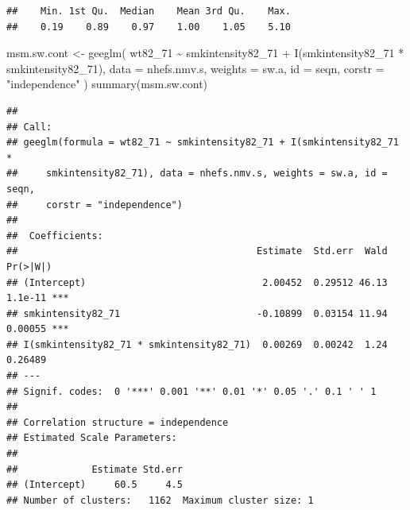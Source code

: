 \documentclass[
  10pt,
]{book}
\newenvironment{Shaded}{\begin{snugshade}}{\end{snugshade}}
\newcommand{\AttributeTok}[1]{\textcolor[rgb]{0.77,0.63,0.00}{#1}}
\newcommand{\CommentTok}[1]{\textcolor[rgb]{0.56,0.35,0.01}{\textit{#1}}}
\newcommand{\DecValTok}[1]{\textcolor[rgb]{0.00,0.00,0.81}{#1}}
\newcommand{\FunctionTok}[1]{\textcolor[rgb]{0.00,0.00,0.00}{#1}}
\newcommand{\NormalTok}[1]{#1}
\newcommand{\OtherTok}[1]{\textcolor[rgb]{0.56,0.35,0.01}{#1}}
\newcommand{\SpecialCharTok}[1]{\textcolor[rgb]{0.00,0.00,0.00}{#1}}
\newcommand{\StringTok}[1]{\textcolor[rgb]{0.31,0.60,0.02}{#1}}
\begin{document}
\begin{Shaded}
\end{Shaded}

\begin{verbatim}
##    Min. 1st Qu.  Median    Mean 3rd Qu.    Max. 
##    0.19    0.89    0.97    1.00    1.05    5.10
\end{verbatim}

\begin{Shaded}
\begin{Highlighting}[]
\NormalTok{msm.sw.cont }\OtherTok{\textless{}{-}}
  \FunctionTok{geeglm}\NormalTok{(}
\NormalTok{    wt82\_71 }\SpecialCharTok{\textasciitilde{}}\NormalTok{ smkintensity82\_71 }\SpecialCharTok{+} \FunctionTok{I}\NormalTok{(smkintensity82\_71 }\SpecialCharTok{*}\NormalTok{ smkintensity82\_71),}
    \AttributeTok{data =}\NormalTok{ nhefs.nmv.s,}
    \AttributeTok{weights =}\NormalTok{ sw.a,}
    \AttributeTok{id =}\NormalTok{ seqn,}
    \AttributeTok{corstr =} \StringTok{"independence"}
\NormalTok{  )}
\FunctionTok{summary}\NormalTok{(msm.sw.cont)}
\end{Highlighting}
\end{Shaded}

\begin{verbatim}
## 
## Call:
## geeglm(formula = wt82_71 ~ smkintensity82_71 + I(smkintensity82_71 * 
##     smkintensity82_71), data = nhefs.nmv.s, weights = sw.a, id = seqn, 
##     corstr = "independence")
## 
##  Coefficients:
##                                          Estimate  Std.err  Wald Pr(>|W|)    
## (Intercept)                               2.00452  0.29512 46.13  1.1e-11 ***
## smkintensity82_71                        -0.10899  0.03154 11.94  0.00055 ***
## I(smkintensity82_71 * smkintensity82_71)  0.00269  0.00242  1.24  0.26489    
## ---
## Signif. codes:  0 '***' 0.001 '**' 0.01 '*' 0.05 '.' 0.1 ' ' 1
## 
## Correlation structure = independence 
## Estimated Scale Parameters:
## 
##             Estimate Std.err
## (Intercept)     60.5     4.5
## Number of clusters:   1162  Maximum cluster size: 1
\end{verbatim}
\end{document}
